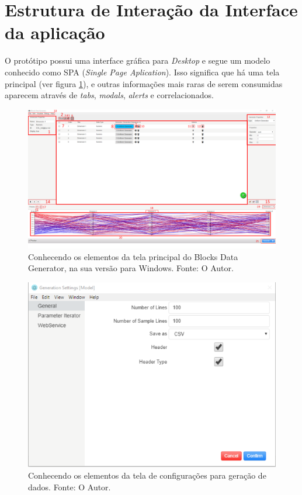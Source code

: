 \documentclass[
	12pt,				%
	openright,			%
	twoside,			%
	a4paper,			%
	english,			%
	brazil				%
	]{abntex2}
\begin{document}
	\section{Estrutura de Interação da Interface da aplicação}
		O protótipo possui uma interface gráfica para \emph{Desktop} e segue um modelo conhecido como SPA (\emph{Single Page Aplication}).
		Isso significa que há uma tela principal (ver figura \ref{fig:telaPrincipal}), e outras informações mais raras de serem consumidas aparecem através de \emph{tabs}, \emph{modals}, \emph{alerts} e correlacionados.
		\begin{figure}[h]
			\centering
			\includegraphics[width=\linewidth]{./figures/prototipo/telaprincipalmarcada.png}
			\caption{Conhecendo os elementos da tela principal do Blocks Data Generator, na sua versão para Windows. Fonte: O Autor.}
			\label{fig:telaPrincipal}
		\end{figure}
		\begin{figure}[h]
			\centering
			\includegraphics[width=\linewidth]{./figures/prototipo/generationSettings.png}
			\caption{Conhecendo os elementos da tela de configurações para geração de dados. Fonte: O Autor.}
			\label{fig:generationSettings}
		\end{figure}
\end{document}
